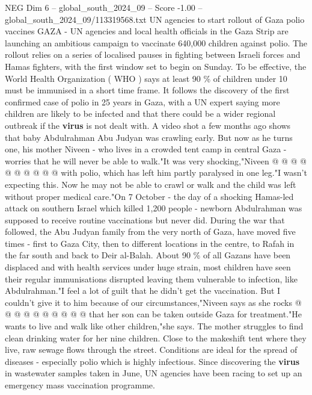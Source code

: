 \begin{textsample}{NEG Dim 6 – global\_south\_2024\_09 – Score -1.00 – global\_south\_2024\_09/113319568.txt}  \label{ex:f6_neg_037}
UN agencies to start rollout of Gaza polio vaccines GAZA - UN agencies and local health officials in the Gaza Strip are launching an ambitious campaign to vaccinate 640,000 children against polio.
The rollout relies on a series of localised pauses in fighting between Israeli forces and Hamas fighters, with the first window set to begin on Sunday.
To be effective, the World Health Organization ( WHO ) says at least 90 \% of children under 10 must be immunised in a short time frame.
It follows the discovery of the first confirmed case of polio in 25 years in Gaza, with a UN expert saying more children are likely to be infected and that there could be a wider regional outbreak if the \textbf{virus} is not dealt with.
A video shot a few months ago shows that baby Abdulrahman Abu Judyan was crawling early.
But now as he turns one, his mother Niveen - who lives in a crowded tent camp in central Gaza - worries that he will never be able to walk."It was very shocking,"Niveen @ @ @ @ @ @ @ @ @ @ with polio, which has left him partly paralysed in one leg."I wasn't expecting this.
Now he may not be able to crawl or walk and the child was left without proper medical care."On 7 October - the day of a shocking Hamas-led attack on southern Israel which killed 1,200 people - newborn Abdulrahman was supposed to receive routine vaccinations but never did.
During the war that followed, the Abu Judyan family from the very north of Gaza, have moved five times - first to Gaza City, then to different locations in the centre, to Rafah in the far south and back to Deir al-Balah.
About 90 \% of all Gazans have been displaced and with health services under huge strain, most children have seen their regular immunisations disrupted leaving them vulnerable to infection, like Abdulrahman."I feel a lot of guilt that he didn't get the vaccination.
But I couldn't give it to him because of our circumstances,"Niveen says as she rocks @ @ @ @ @ @ @ @ @ @ that her son can be taken outside Gaza for treatment."He wants to live and walk like other children,"she says.
The mother struggles to find clean drinking water for her nine children.
Close to the makeshift tent where they live, raw sewage flows through the street.
Conditions are ideal for the spread of diseases - especially polio which is highly infectious.
Since discovering the \textbf{virus} in wastewater samples taken in June, UN agencies have been racing to set up an emergency mass vaccination programme.

\end{textsample}
